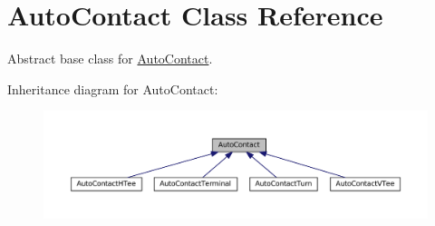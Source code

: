 \hypertarget{classKatabatic_1_1AutoContact}{}\section{Auto\+Contact Class Reference}
\label{classKatabatic_1_1AutoContact}


Abstract base class for \mbox{\hyperlink{classKatabatic_1_1AutoContact}{Auto\+Contact}}.  




Inheritance diagram for Auto\+Contact\+:\nopagebreak
\begin{figure}[H]
\begin{center}
\leavevmode
\includegraphics[width=350pt]{classKatabatic_1_1AutoContact__inherit__graph}
\end{center}
\end{figure}
